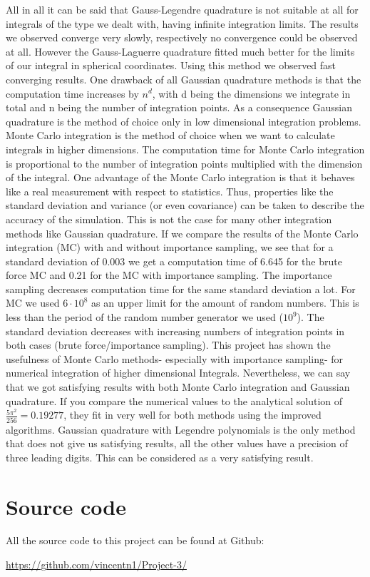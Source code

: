 \documentclass[10pt,a4paper]{article}
\begin{document}
All in all it can be said that Gauss-Legendre quadrature is not suitable at all for integrals of the type we dealt with, having infinite integration limits. The results we observed converge very slowly, respectively no convergence could be observed at all. However the Gauss-Laguerre quadrature fitted much better for the limits of our integral in spherical coordinates. Using this method we observed fast converging results. One drawback of all Gaussian quadrature methods is that the computation time increases by $n^d$, with d being the dimensions we integrate in total and n being the number of integration points. As a consequence Gaussian quadrature is the method of choice only in low dimensional integration problems.
Monte Carlo integration is the method of choice when we want to calculate integrals in higher dimensions. The computation time for Monte Carlo integration is proportional to the number of integration points multiplied with the dimension of the integral. One advantage of the Monte Carlo integration is that it behaves like a real measurement with respect to statistics. Thus, properties like the standard deviation and variance (or even covariance) can be taken to describe the accuracy of the simulation. This is not the case for many other integration methods like Gaussian quadrature. If we compare the results of the Monte Carlo integration (MC) with and without importance sampling, we see that for a standard deviation of 0.003 we get a computation time of 6.645 for the brute force MC and 0.21 for the MC with importance sampling. The importance sampling decreases computation time for the same standard deviation a lot. For MC we used $6 \cdot 10^{8}$ as an upper limit for the amount of random numbers. This is less than the period of the random number generator we used ($10^{9}$). The standard deviation decreases with increasing numbers of integration points in both cases (brute force/importance sampling). This project has shown the usefulness of Monte Carlo methods- especially with importance sampling- for numerical integration of higher dimensional Integrals.
Nevertheless, we can say that we got satisfying results with both Monte Carlo integration and Gaussian quadrature. If you compare the numerical values to the analytical solution of $\frac{5\pi^2}{256}=0.19277$, they fit in very well for both methods using the improved algorithms. Gaussian quadrature with Legendre polynomials is the only method that does not give us satisfying results, all the other values have a precision of three leading digits. This can be considered as a very satisfying result.



\section{Source code}

All the source code to this project can be found at Github:

\url{https://github.com/vincentn1/Project-3/}
\end{document}

